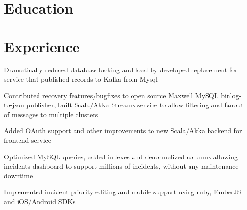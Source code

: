 \documentclass[12pt]{jmichaud-resume}
\begin{document}
\begin{minipage}[t]{0.3\textwidth}
\vspace{20pt}

\section{Education} 



\end{minipage}
\hfill
\begin{minipage}[t]{0.65\textwidth}
\section{Experience}
 \hfill {}

\vspace{7pt}
\begin{tightemize}
	\item Dramatically reduced database locking and load by developed replacement for service that published records to Kafka from Mysql
	\item Contributed recovery features/bugfixes to open source Maxwell MySQL binlog-to-json publisher, built Scala/Akka Streams service to allow filtering and fanout of messages to multiple clusters
	\item Added OAuth support and other improvements to new Scala/Akka backend for frontend service
	
\end{tightemize}
\sectionsep
{}\hfill {}

\begin{tightemize}
	\item Optimized MySQL queries, added indexes and denormalized columns allowing incidents dashboard to support millions of incidents, without any maintenance downtime
	\item Implemented incident priority editing and mobile support using ruby, EmberJS and iOS/Android SDKs
\end{tightemize}
\sectionsep

 \hfill {}


\end{minipage}
\end{document}
